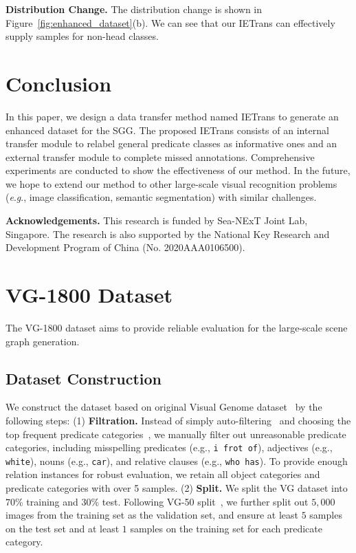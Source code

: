 \documentclass[runningheads]{llncs}
\newcommand{\eg}{\textit{e}.\textit{g}.}
\begin{document}
\smallskip
\noindent
\textbf{Distribution Change.}
The distribution change is shown in Figure~\ref{fig:enhanced_dataset}(b).
We can see that our IETrans can effectively supply samples for non-head classes.





\section{Conclusion}
In this paper, we design a data transfer method named IETrans to generate an enhanced dataset for the SGG. 
The proposed IETrans consists of an internal transfer module to relabel general predicate classes as informative ones and an external transfer module to complete missed annotations.
Comprehensive experiments are conducted to show the effectiveness of our method.
In the future, we hope to extend our method to other large-scale visual recognition problems (\eg, image classification, semantic segmentation) with similar challenges.



\bigskip
\noindent
\textbf{Acknowledgements.}
This research is funded by Sea-NExT Joint Lab, Singapore. The research is also supported by the National Key Research and Development Program of China (No. 2020AAA0106500).




\clearpage

\appendix

\section{VG-1800 Dataset}
The VG-1800 dataset aims to provide reliable evaluation for the large-scale scene graph generation.

\subsection{Dataset Construction}
We construct the dataset based on original Visual Genome dataset~\cite{krishna2017visual} by the following steps: (1) \textbf{Filtration.} Instead of simply auto-filtering~\cite{zhang2019large} and choosing the top frequent predicate categories~\cite{abdelkarim2020long}, we manually filter out unreasonable predicate categories, including misspelling predicates (e.g., \texttt{i frot of}), adjectives (e.g., \texttt{white}), nouns (e.g., \texttt{car}), and relative clauses (e.g., \texttt{who has}).
To provide enough relation instances for robust evaluation, we retain all object categories and predicate categories with over 5 samples.
(2) \textbf{Split.} 
We split the VG dataset into $70$\% training and $30$\% test.
Following VG-50 split~\cite{xu2017scene}, we further split out $5,000$ images from the training set as the validation set, and ensure at least $5$ samples on the test set and at least $1$ samples on the training set for each predicate category.
\end{document}
